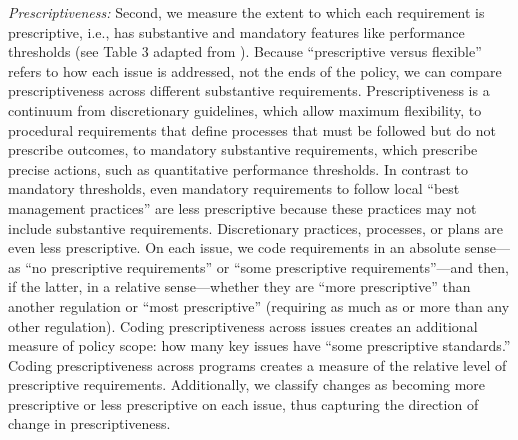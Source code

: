 \documentclass[
      12pt,
            Review ]{article}
\begin{document}
\emph{Prescriptiveness:} Second, we measure the extent to which each
requirement is prescriptive, i.e., has substantive and mandatory
features like performance thresholds (see Table 3 adapted from
\citet{Cashore2007}). Because ``prescriptive versus flexible'' refers to
how each issue is addressed, not the ends of the policy, we can compare
prescriptiveness across different substantive requirements.
Prescriptiveness is a continuum from discretionary guidelines, which
allow maximum flexibility, to procedural requirements that define
processes that must be followed but do not prescribe outcomes, to
mandatory substantive requirements, which prescribe precise actions,
such as quantitative performance thresholds. In contrast to mandatory
thresholds, even mandatory requirements to follow local ``best
management practices'' are less prescriptive because these practices may
not include substantive requirements. Discretionary practices,
processes, or plans are even less prescriptive. On each issue, we code
requirements in an absolute sense---as ``no prescriptive requirements''
or ``some prescriptive requirements''---and then, if the latter, in a
relative sense---whether they are ``more prescriptive'' than another
regulation or ``most prescriptive'' (requiring as much as or more than
any other regulation). Coding prescriptiveness across issues creates an
additional measure of policy scope: how many key issues have ``some
prescriptive standards.'' Coding prescriptiveness across programs
creates a measure of the relative level of prescriptive requirements.
Additionally, we classify changes as becoming more prescriptive or less
prescriptive on each issue, thus capturing the direction of change in
prescriptiveness.


\end{document}
